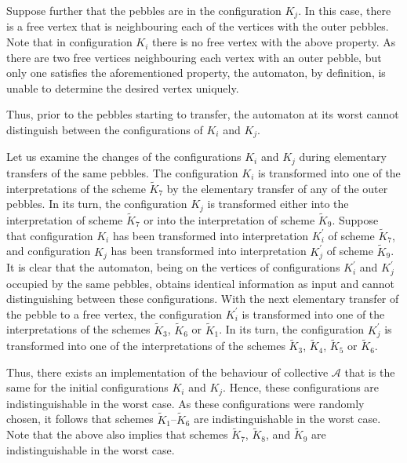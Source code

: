 \documentclass{article}
\newenvironment{proof}[1][Proof]{\begin{trivlist}
\item[\hskip \labelsep {\bfseries #1}]}{\end{trivlist}}
\begin{document}
\begin{proof}
Suppose further that the pebbles are in the configuration $K_{j}$.
In this case, there is a free vertex that is neighbouring each of the vertices with the outer pebbles. 
Note that in configuration $K_{i}$ there is no free vertex with the above property.
As there are two free vertices neighbouring each vertex with an outer pebble, but only one satisfies the aforementioned property, the automaton, by definition, is unable to determine the desired vertex uniquely.

Thus, prior to the pebbles starting to transfer, the automaton at its worst cannot distinguish between the configurations of $K_{i}$ and $K_{j}$.

Let us examine the changes of the configurations $K_{i}$ and $K_{j}$ during elementary transfers of the same pebbles.
The configuration $K_{i}$ is transformed into one of the interpretations of the scheme $\widetilde K_{7}$ by the elementary transfer of any of the outer pebbles. 
In its turn, the configuration $K_{j}$ is transformed either into the interpretation of scheme $\widetilde K_{7}$ or into the interpretation of scheme $\widetilde K_{9}$.
Suppose that configuration $K_{i}$ has been transformed into interpretation $K^{\prime}_{i}$ of scheme $\widetilde K_{7}$, and configuration $K_{j}$ has been transformed into interpretation $K^{\prime}_{j}$ of scheme $\widetilde K_{9}$.
It is clear that the automaton, being on the vertices of configurations $K^{\prime}_{i}$ and $K^{\prime}_{j}$ occupied by the same pebbles, obtains identical information as input and cannot distinguishing between these configurations.
With the next elementary transfer of the pebble to a free vertex, the configuration $K^{\prime}_{i}$ is transformed into one of the interpretations of the schemes $\widetilde K_{3}$, $\widetilde K_{6}$ or $\widetilde K_{1}$. In its turn, the configuration $K^{\prime}_{j}$ is transformed into one of the interpretations of the schemes $\widetilde K_{3}$, $\widetilde K_{4}$, $\widetilde K_{5}$ or $\widetilde K_{6}$.

Thus, there exists an implementation of the behaviour of collective $\mathcal{A}$ that is the same for the initial configurations $K_{i}$ and $K_{j}$. 
Hence, these configurations are indistinguishable in the worst case. 
As these configurations were randomly chosen, it follows that schemes $\widetilde K_{1}$--$\widetilde K_{6}$ are indistinguishable in the worst case.
Note that the above also implies that schemes $\widetilde K_{7}$, $\widetilde K_{8}$, and $\widetilde K_{9}$ are indistinguishable in the worst case.


\end{proof}
\end{document}
